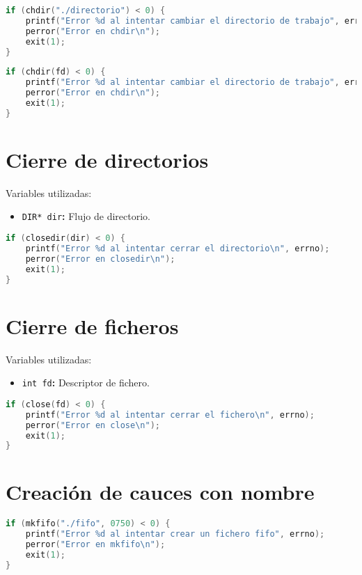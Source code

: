 \begin{lstlisting}[language=C]
if (chdir("./directorio") < 0) {
	printf("Error %d al intentar cambiar el directorio de trabajo", errno);
	perror("Error en chdir\n");
	exit(1);
}

\end{lstlisting}
\begin{lstlisting}[language=C]
if (chdir(fd) < 0) {
	printf("Error %d al intentar cambiar el directorio de trabajo", errno);
	perror("Error en chdir\n");
	exit(1);
}
\end{lstlisting}

\pagebreak

\section{Cierre de directorios}

Variables utilizadas:

\begin{itemize}
	\item\texttt{DIR* dir}\textbf{:} Flujo de directorio.
\end{itemize}

\begin{lstlisting}[language=C]
if (closedir(dir) < 0) {
	printf("Error %d al intentar cerrar el directorio\n", errno);
	perror("Error en closedir\n");
	exit(1);
}
\end{lstlisting}

\section{Cierre de ficheros}

Variables utilizadas:

\begin{itemize}
	\item\texttt{int fd}\textbf{:} Descriptor de fichero.
\end{itemize}

\begin{lstlisting}[language=C]
if (close(fd) < 0) {
	printf("Error %d al intentar cerrar el fichero\n", errno);
	perror("Error en close\n");
	exit(1);
}
\end{lstlisting}

\section{Creación de cauces con nombre}

\begin{lstlisting}[language=C]
if (mkfifo("./fifo", 0750) < 0) {
	printf("Error %d al intentar crear un fichero fifo", errno);
	perror("Error en mkfifo\n");
	exit(1);
}
\end{lstlisting}

